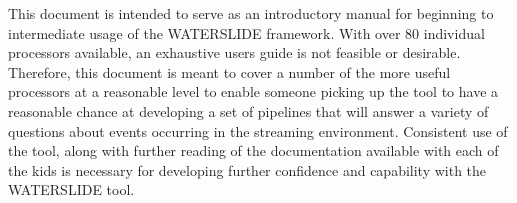 \documentclass[11pt]{article}
\begin{document}
This document is intended to serve as an introductory manual for beginning to intermediate usage of
the WATERSLIDE framework.  With over 80 individual processors available, an exhaustive users guide is not feasible or desirable.  Therefore, this document is meant to cover a number of the more useful processors at a reasonable level to enable someone picking up the tool to have a reasonable chance at developing a set of pipelines that will answer a variety of questions about events occurring in the streaming environment.  Consistent use of the tool, along with further reading of the documentation available with each of the kids is necessary for developing further confidence and capability with the WATERSLIDE tool.

{}

\end{document}

